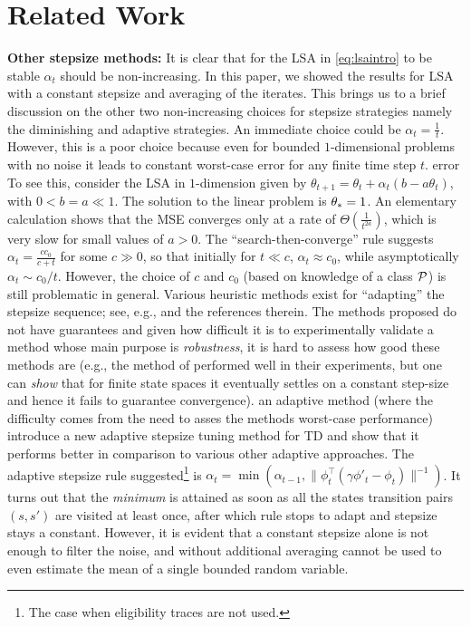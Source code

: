 \section{Related Work}\label{sec:related}
\textbf{Other stepsize methods:} 
It is clear that for the LSA in \eqref{eq:lsaintro} to be stable $\alpha_t$ should be non-increasing. In this paper, we showed the results for LSA with a constant stepsize and averaging of the iterates.  This brings us to a brief discussion on the other two non-increasing choices for stepsize strategies namely the diminishing and adaptive strategies.
An immediate choice could be $\alpha_t=\frac{1}{t}$.
However, this is a poor choice because even for bounded
$1$-dimensional problems with no noise it leads to constant worst-case error for any finite time step $t$.
error 
To see this, consider the LSA in $1$-dimension given by $\theta_{t+1}=\theta_t+\alpha_t(b-a\theta_t)$, with $0<b=a\ll 1$. The solution to the linear  problem is $\theta_*=1$.
An elementary calculation shows that the MSE converges only at a rate of $\Theta(\frac{1}{t^{2a}})$, which is very slow for small values of $a>0$. The ``search-then-converge'' rule suggests 
$\alpha_t=\frac{cc_0}{c+t}$ for some $c\gg 0$, so that initially for $t \ll c$, $\alpha_t \approx c_0$, while asymptotically $\alpha_t \sim c_0/t$. 
However, the choice of $c$ and $c_0$ (based on knowledge of a class $\mathcal{P}$) is still problematic in general.
\fi
Various heuristic methods exist for ``adapting'' the stepsize sequence; see, e.g., \cite{dab} and the references therein.
The methods proposed do not have guarantees and given how difficult it is to experimentally validate a method
whose main purpose is \emph{robustness}, it is hard to assess how good these methods are
(e.g., the method of \citet{dab} performed well in their experiments, but one can \emph{show} that for finite state spaces it eventually settles on a constant step-size and hence it fails to guarantee convergence).
an adaptive method (where the difficulty comes from the need to asses the methods worst-case performance)
\citet{dab} introduce a new adaptive stepsize tuning method for TD and show that it performs better in comparison to various other adaptive approaches. The adaptive stepsize rule suggested\footnote{The case when eligibility traces are not used.} is $\alpha_t=\min(\alpha_{t-1},\parallel\phi^\top_t(\gamma\phi'_t-\phi_t)\parallel^{-1})$. It turns out that the \emph{minimum} is attained as soon as all the states transition pairs $(s,s')$ are visited at least once, after which rule stops to adapt and stepsize stays a constant. However, it is evident that a constant stepsize alone is not enough to filter the noise, and without additional averaging cannot be used to even estimate the mean of a single bounded random variable. 
\fi

